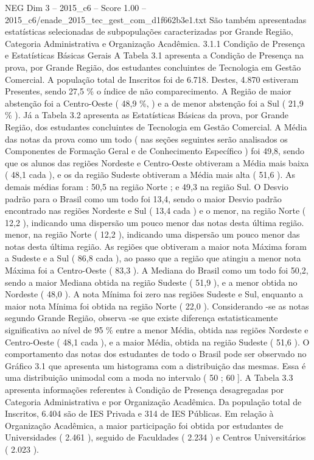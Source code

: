 \begin{textsample}{NEG Dim 3 – 2015\_c6 – Score 1.00 – 2015\_c6/enade\_2015\_tec\_gest\_com\_d1f662b3e1.txt}
São também apresentadas estatísticas selecionadas de subpopulações caracterizadas por Grande Região, Categoria Administrativa e Organização Acadêmica. 3.1.1 Condição de Presença e Estatísticas Básicas Gerais A Tabela 3.1 apresenta a Condição de Presença na prova, por Grande Região, dos estudantes concluintes de Tecnologia em Gestão Comercial.
A população total de Inscritos foi de 6.718.
Destes, 4.870 estiveram Presentes, sendo 27,5 \% o índice de não comparecimento.
A Região de maior abstenção foi a Centro-Oeste ( 48,9 \%, ) e a de menor abstenção foi a Sul ( 21,9 \% ).
Já a Tabela 3.2 apresenta as Estatísticas Básicas da prova, por Grande Região, dos estudantes concluintes de Tecnologia em Gestão Comercial.
A Média das notas da prova como um todo ( nas seções seguintes serão analisados os Componentes de Formação Geral e de Conhecimento Específico ) foi 49,8, sendo que os alunos das regiões Nordeste e Centro-Oeste obtiveram a Média mais baixa ( 48,1 cada ), e os da região Sudeste obtiveram a Média mais alta ( 51,6 ).
As demais médias foram : 50,5 na região Norte ; e 49,3 na região Sul.
O Desvio padrão para o Brasil como um todo foi 13,4, sendo o maior Desvio padrão encontrado nas regiões Nordeste e Sul ( 13,4 cada ) e o menor, na região Norte ( 12,2 ), indicando uma dispersão um pouco menor das notas desta última região. menor, na região Norte ( 12,2 ), indicando uma dispersão um pouco menor das notas desta última região.
As regiões que obtiveram a maior nota Máxima foram a Sudeste e a Sul ( 86,8 cada ), ao passo que a região que atingiu a menor nota Máxima foi a Centro-Oeste ( 83,3 ).
A Mediana do Brasil como um todo foi 50,2, sendo a maior Mediana obtida na região Sudeste ( 51,9 ), e a menor obtida no Nordeste ( 48,0 ).
A nota Mínima foi zero nas regiões Sudeste e Sul, enquanto a maior nota Mínima foi obtida na região Norte ( 22,0 ).
Considerando -se as notas segundo Grande Região, observa -se que existe diferença estatisticamente significativa ao nível de 95 \% entre a menor Média, obtida nas regiões Nordeste e Centro-Oeste ( 48,1 cada ), e a maior Média, obtida na região Sudeste ( 51,6 ).
O comportamento das notas dos estudantes de todo o Brasil pode ser observado no Gráfico 3.1 que apresenta um histograma com a distribuição das mesmas.
Essa é uma distribuição unimodal com a moda no intervalo ( 50 ; 60 ].
A Tabela 3.3 apresenta informações referentes à Condição de Presença desagregadas por Categoria Administrativa e por Organização Acadêmica.
Da população total de Inscritos, 6.404 são de IES Privada e 314 de IES Públicas.
Em relação à Organização Acadêmica, a maior participação foi obtida por estudantes de Universidades ( 2.461 ), seguido de Faculdades ( 2.234 ) e Centros Universitários ( 2.023 ).

\end{textsample}
